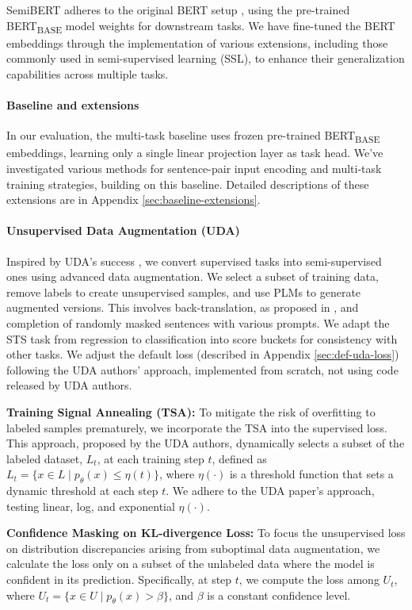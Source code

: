 \documentclass{article}
\begin{document}
SemiBERT adheres to the original BERT setup \cite{devlin2019bert}, using the pre-trained 
BERT\textsubscript{BASE} model weights for downstream tasks. We have fine-tuned the BERT 
embeddings through the implementation of various extensions, including those commonly 
used in semi-supervised learning (SSL), to enhance their generalization capabilities 
across multiple tasks.

\paragraph{Baseline and extensions} 
In our evaluation, the multi-task baseline uses frozen pre-trained BERT\textsubscript{BASE} 
embeddings, learning only a single linear projection layer as task head. We've 
investigated various methods for sentence-pair input encoding and multi-task training 
strategies, building on this baseline. Detailed descriptions of these extensions are in 
Appendix \ref{sec:baseline-extensions}.

\paragraph{Unsupervised Data Augmentation (UDA)}
Inspired by UDA's success \cite{xie2020unsupervised}, we convert supervised tasks into semi-supervised ones 
using advanced data augmentation. We select a subset of training data, remove labels to 
create unsupervised samples, and use PLMs to generate augmented versions. This involves 
back-translation, as proposed in \cite{xie2020unsupervised}, and completion of randomly masked sentences with 
various prompts. We adapt the STS task from regression to classification into 
score buckets for consistency with other tasks. We adjust the default loss (described in 
Appendix \ref{sec:def-uda-loss}) following the UDA authors' approach, 
implemented from scratch, not using code released by UDA authors.

\textbf{Training Signal Annealing (TSA):}
To mitigate the risk of overfitting to labeled samples prematurely, we incorporate the 
TSA into the supervised loss. This approach, proposed 
by the UDA authors, dynamically selects a subset of the labeled dataset, $L_t$, at each 
training step $t$, defined as $L_t = \{x \in L \mid p_{\theta}(x) \leq 
\eta(t)\}$, where $\eta(\cdot)$ is a threshold function that sets a dynamic threshold at 
each step $t$. 
We adhere to the UDA paper's approach, testing linear, log, and exponential $\eta(\cdot)$.

\textbf{Confidence Masking on KL-divergence Loss:}
To focus the unsupervised loss on distribution discrepancies arising from suboptimal data 
augmentation, we calculate the loss only on a subset of the unlabeled data where the model 
is confident in its prediction. Specifically, at step $t$, we compute the loss among $U_t$, 
where $U_t = \{x \in U \mid p_{\theta}(x) > \beta\}$, and $\beta$ is a constant confidence 
level. 
\end{document}
